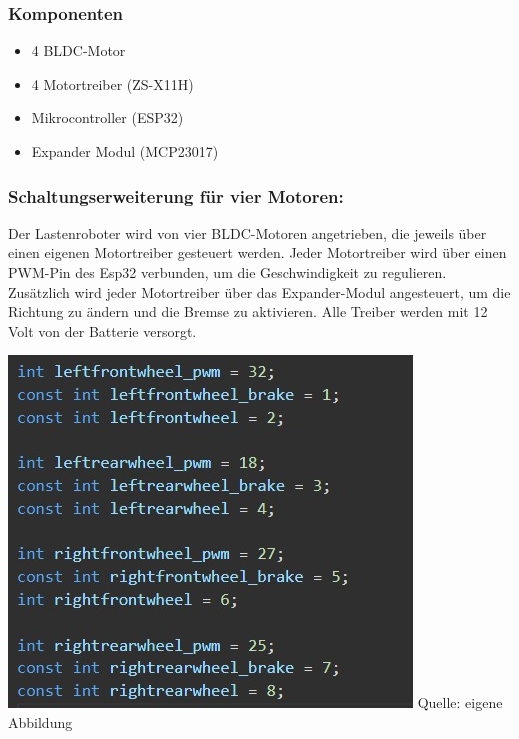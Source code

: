 \documentclass[ngerman,12pt,a4paper]{article}
\begin{document}
			\subsubsection{Komponenten}
			\begin{itemize}
				\item 4 BLDC-Motor
				\item 4 Motortreiber (ZS-X11H)
				\item Mikrocontroller (ESP32)
				\item Expander Modul (MCP23017)
			\end{itemize}
			\newpage
			
			\subsubsection{Schaltungserweiterung für vier Motoren:}
			Der Lastenroboter wird von vier BLDC-Motoren angetrieben, die jeweils über einen eigenen Motortreiber gesteuert werden. Jeder Motortreiber wird über einen PWM-Pin des Esp32 verbunden, um die Geschwindigkeit zu regulieren. Zusätzlich wird jeder Motortreiber über das Expander-Modul angesteuert, um die Richtung zu ändern und die Bremse zu aktivieren. Alle Treiber werden mit 12 Volt von der Batterie versorgt. \\[0.5cm]
			\begin{minipage}{\textwidth}
				\centering
				\includegraphics[scale=1.05]{Pictures/code_pins_motoren}
				\label{fig:code_pins_motoren}
				\vspace{-2pt}
				\small Quelle: eigene Abbildung
			\end{minipage}
			
\end{document}
